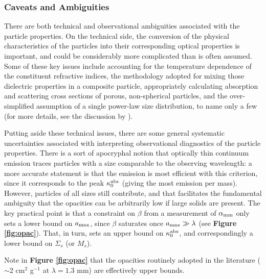 \documentclass[a4paper]{ar-1col}
\begin{document}

\subsubsection{Caveats and Ambiguities}
There are both technical and observational ambiguities associated with the particle properties.  On the technical side, the conversion of the physical characteristics of the particles into their corresponding optical properties is important, and could be considerably more complicated than is often assumed.  Some of these key issues include accounting for the temperature dependence of the constituent refractive indices, the methodology adopted for mixing those dielectric properties in a composite particle, appropriately calculating absorption and scattering cross sections of porous, non-spherical particles, and the over-simplified assumption of a single power-law size distribution, to name only a few (for more details, see the discussion by \citealt{dsharp5}).   

Putting aside these technical issues, there are some general systematic uncertainties associated with interpreting observational diagnostics of the particle properties.  There is a sort of apocryphal notion that optically thin continuum emission traces particles with a size comparable to the observing wavelength: a more accurate statement is that the emission is most efficient with this criterion, since it corresponds to the peak $\kappa_0^{\rm abs}$ (giving the most emission per mass).  However, particles of all sizes still contribute, and that facilitates the fundamental ambiguity that the opacities can be arbitrarily low if large solids are present.  The key practical point is that a constraint on $\beta$ from a measurement of $\alpha_{\rm mm}$ only sets a lower bound on $a_{\rm max}$, since $\beta$ saturates once $a_{\rm max} \gg \lambda$ (see {\bf Figure \ref{fig:opac}}).  That, in turn, sets an upper bound on $\kappa_0^{\rm abs}$, and correspondingly a lower bound on $\Sigma_s$ (or $M_s$).  
\begin{marginnote}
Note in {\bf Figure \ref{fig:opac}} that the opacities routinely adopted in the literature ($\sim$2 cm$^2$ g$^{-1}$ at $\lambda = 1.3$ mm) are effectively upper bounds. 
\end{marginnote}
\end{document}
